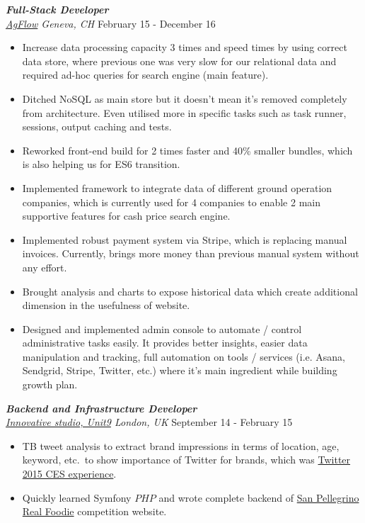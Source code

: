 \documentclass[line, margin]{res}
\begin{document}
\begin{resume}
{\sl \textbf{Full-Stack Developer} \\ \href{http://www.agflow.com}{AgFlow} Geneva, CH} \hfill February 15 - December 16 \\
\vspace{-0.3cm}
\begin{itemize}
  \item Increase data processing capacity 3 times and speed  times by using correct data store, where previous one was very slow for our relational data and required ad-hoc queries for search engine (main feature).
  \item Ditched NoSQL as main store but it doesn't mean it's removed completely from architecture. Even utilised more in specific tasks such as task runner, sessions, output caching and tests.
  \item Reworked front-end build for 2 times faster and 40\% smaller bundles, which is also helping us for ES6 transition.
  \item Implemented framework to integrate data of different ground operation companies, which is currently used for 4 companies to enable 2 main supportive features for cash price search engine.
  \item Implemented robust payment system via Stripe, which is replacing manual invoices. Currently, brings more money than previous manual system without any effort.
  \item Brought analysis and charts to expose historical data which create additional dimension in the usefulness of website.
  \item Designed and implemented admin console to automate / control administrative tasks easily. It provides better insights, easier data manipulation and tracking, full automation on tools / services  (i.e. Asana, Sendgrid, Stripe, Twitter, etc.) where it's main ingredient while building growth plan.
\end{itemize}

{\sl \textbf{Backend and Infrastructure Developer} \\ \href{http://www.unit9.com/}{Innovative studio, Unit9} London, UK} \hfill September 14 - February 15 \\
\vspace{-0.3cm}
\begin{itemize}
  \item {} TB tweet analysis to extract brand impressions in terms of location, age, keyword, etc.\ to show importance of Twitter for brands, which was \href{http://www.unit9.com/innovation/twitter-ces-experience}{Twitter 2015 CES experience}.
  \item Quickly learned Symfony \(PHP\) and wrote complete backend of \href{https://realfoodie.sanpellegrino.com/}{San Pellegrino Real Foodie} competition website.
\end{itemize}


\end{resume}
\end{document}
